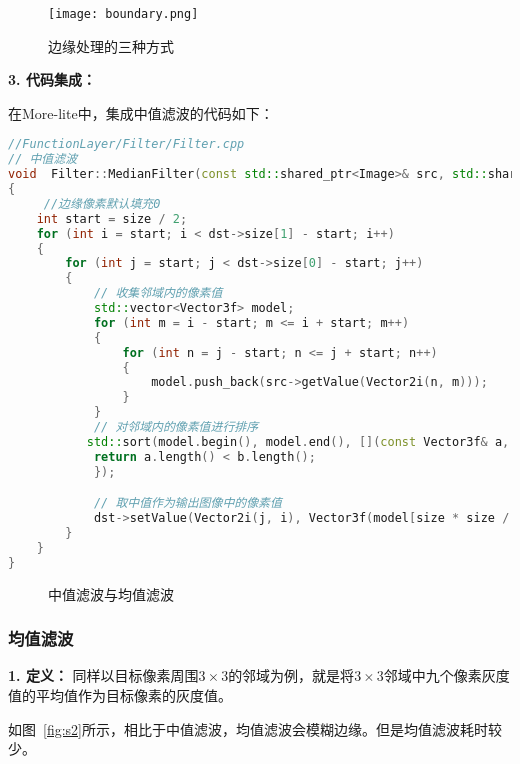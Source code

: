 \documentclass[lang=cn,10pt]{elegantbook}
\begin{document}
\begin{figure}
    \centering
    \texttt{[image: boundary.png]}
    \caption{边缘处理的三种方式}
    \label{fig:boundary}
\end{figure}



\textcolor{third}{\textbf{3. 代码集成：}}

在More-lite中，集成中值滤波的代码如下： 
\begin{lstlisting}[language=c++]
//FunctionLayer/Filter/Filter.cpp
// 中值滤波
void  Filter::MedianFilter(const std::shared_ptr<Image>& src, std::shared_ptr<Image>& dst,double size)
{
     //边缘像素默认填充0
    int start = size / 2;
    for (int i = start; i < dst->size[1] - start; i++)
    {
        for (int j = start; j < dst->size[0] - start; j++)
        {
            // 收集邻域内的像素值
            std::vector<Vector3f> model;
            for (int m = i - start; m <= i + start; m++)
            {
                for (int n = j - start; n <= j + start; n++)
                {
                    model.push_back(src->getValue(Vector2i(n, m)));
                }
            }
            // 对邻域内的像素值进行排序
           std::sort(model.begin(), model.end(), [](const Vector3f& a, const Vector3f& b) {
            return a.length() < b.length();
            });

            // 取中值作为输出图像中的像素值
            dst->setValue(Vector2i(j, i), Vector3f(model[size * size / 2]));
        }
    }
}
\end{lstlisting}

\begin{figure}
  \centering

  \hfill

  \caption{中值滤波与均值滤波}
  \label{fig:me}
\end{figure}

\subsubsection{均值滤波}
\textcolor{third}{\textbf{1. 定义：}}
同样以目标像素周围$3\times 3$的邻域为例，就是将$3\times 3$邻域中九个像素灰度值的平均值作为目标像素的灰度值。

如图~\ref{fig:s2}所示，相比于中值滤波，均值滤波会模糊边缘。但是均值滤波耗时较少。
\end{document}
